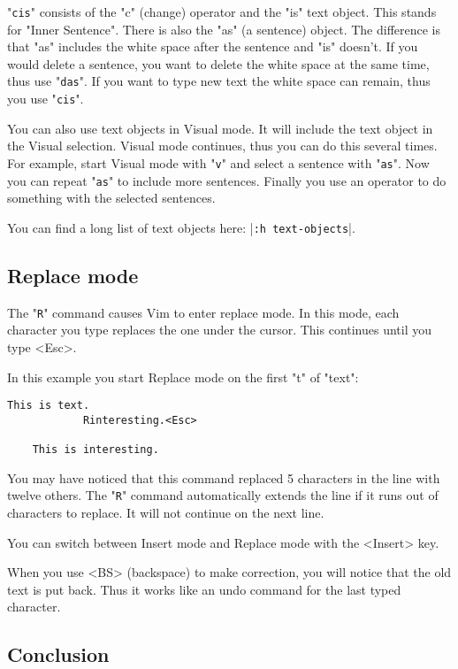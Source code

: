 "\verb!cis!" consists of the "c" (change) operator and the "is" text object.
This stands for "Inner Sentence".
There is also the "as" (a sentence) object.
The difference is that "as" includes the white space after the sentence and "is" doesn't.
If you would delete a sentence, you want to delete the white space at the same time, thus use "\verb!das!".
If you want to type new text the white space can remain, thus you use "\verb!cis!".

You can also use text objects in Visual mode.
It will include the text object in the Visual selection.
Visual mode continues, thus you can do this several times.
For example, start Visual mode with "\verb!v!" and select a sentence with "\verb!as!".
Now you can repeat "\verb!as!" to include more sentences.
Finally you use an operator to do something with the selected sentences.

You can find a long list of text objects here: |\verb!:h text-objects!|.

\subsection{Replace mode}
\label{Replace mode}

The "\verb!R!" command causes Vim to enter replace mode.
In this mode, each character you type replaces the one under the cursor.
This continues until you type <Esc>.

In this example you start Replace mode on the first "t" of "text":

\begin{Verbatim}[samepage=true]
    This is text. 
            Rinteresting.<Esc>

    This is interesting. 
\end{Verbatim}

You may have noticed that this command replaced 5 characters in the line with twelve others.
The "\verb!R!" command automatically extends the line if it runs out of characters to replace.
It will not continue on the next line.

You can switch between Insert mode and Replace mode with the <Insert> key.

When you use <BS> (backspace) to make correction, you will notice that the old text is put back.
Thus it works like an undo command for the last typed character.

\subsection{Conclusion}

